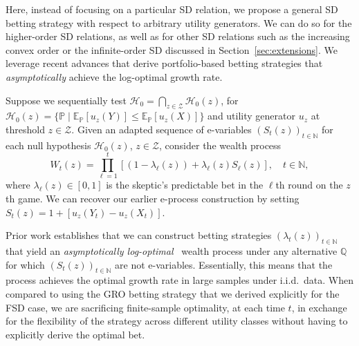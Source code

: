\documentclass[12pt,twoside]{article}
\theoremstyle{plain}
\theoremstyle{definition}
\theoremstyle{remark}
\newcommand{\insquare}[1]{\left[#1\right]}
\newcommand{\N}{\mathbb{N}}
\newcommand{\calH}{\mathcal{H}}
\newcommand{\calZ}{\mathcal{Z}}
\newcommand{\Esymb}{\mathbb{E}}
\newcommand{\Psymb}{\mathbb{P}}
\newcommand{\Qsymb}{\mathbb{Q}}
\newcommand{\Ex}[2]{\Esymb_{{#1}}\left[{#2}\right]}
\newcommand{\fbet}{\lambda}  %
\begin{document}
Here, instead of focusing on a particular SD relation, we propose a general SD betting strategy with respect to arbitrary utility generators. 
We can do so for the higher-order SD relations, as well as for other SD relations such as the increasing convex order or the infinite-order SD discussed in Section~\ref{sec:extensions}. 
We leverage recent advances that derive portfolio-based betting strategies that \emph{asymptotically} achieve the log-optimal growth rate. 

Suppose we sequentially test $\calH_0 = \bigcap_{z \in \calZ} \calH_0(z)$, for $\calH_0(z) = \{\Psymb \mid \Ex{\Psymb}{u_z(Y)} \leq \Ex{\Psymb}{u_z(X)}\}$ and utility generator $u_z$ at threshold $z \in \calZ$.  
Given an adapted sequence of e-variables $(S_t(z))_{t\in \N}$ for each null hypothesis $\calH_0(z)$, $z \in \calZ$, consider the wealth process
\begin{equation}\label{eq:wealth_fbet}
    W_t(z) = \prod_{\ell=1}^t \insquare{(1 - \fbet_{\ell}(z)) + \fbet_{\ell}(z) S_{\ell}(z)}, \quad t\in \N,
\end{equation}
where $\fbet_{\ell}(z) \in [0,1]$ is the skeptic's predictable bet in the $\ell$th round on the $z$th game. 
We can recover our earlier e-process construction by setting $S_t(z) = 1 + [u_z(Y_t) - u_z(X_t)]$. 

Prior work establishes that we can construct betting strategies $(\lambda_t(z))_{t\in \N}$ that yield an \emph{asymptotically log-optimal}~\citep{waudbysmith2025universal,wang2025ebacktesting} wealth process under any alternative $\Qsymb$ for which $(S_t(z))_{t\in \N}$ are not e-variables. 
Essentially, this means that the process achieves the optimal growth rate in large samples under i.i.d.~data.
When compared to using the GRO betting strategy that we derived explicitly for the FSD case, we are sacrificing finite-sample optimality, at each time $t$, in exchange for the flexibility of the strategy across different utility classes without having to explicitly derive the optimal bet. 
\end{document}

